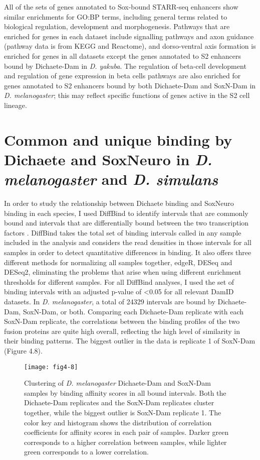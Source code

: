 All of the sets of genes annotated to Sox-bound STARR-seq enhancers show similar enrichments for GO:BP terms, including general terms related to biological regulation, development and morphogenesis. Pathways that are enriched for genes in each dataset include signalling pathways and axon guidance (pathway data is from KEGG and Reactome), and dorso-ventral axis formation is enriched for genes in all datasets except the genes annotated to S2 enhancers bound by Dichaete-Dam in \emph{D. yakuba}. The regulation of beta-cell development and regulation of gene expression in beta cells pathways are also enriched for genes annotated to S2 enhancers bound by both Dichaete-Dam and SoxN-Dam in \emph{D. melanogaster}; this may reflect specific functions of genes active in the S2 cell lineage.

\section{Common and unique binding by Dichaete and SoxNeuro in \emph{D. melanogaster} and \emph{D. simulans}}
In order to study the relationship between Dichaete binding and SoxNeuro binding in each species, I used DiffBind to identify intervals that are commonly bound and intervals that are differentially bound between the two transcription factors \citep{ross-innes_differential_2012-1}. DiffBind takes the total set of binding intervals called in any sample included in the analysis and considers the read densities in those intervals for all samples in order to detect quantitative differences in binding. It also offers three different methods for normalizing all samples together, edgeR, DESeq and DESeq2, eliminating the problems that arise when using different enrichment thresholds for different samples. For all DiffBind analyses, I used the set of binding intervals with an adjusted p-value of \textless 0.05 for all relevant DamID datasets. In \emph{D. melanogaster}, a total of 24329 intervals are bound by Dichaete-Dam, SoxN-Dam, or both. Comparing each Dichaete-Dam replicate with each SoxN-Dam replicate, the correlations between the binding profiles of the two fusion proteins are quite high overall, reflecting the high level of similarity in their binding patterns. The biggest outlier in the data is replicate 1 of SoxN-Dam (Figure 4.8).\\ 

\begin{figure}[H]
\centering
\texttt{[image: fig4-8]}
\caption{Clustering of \emph{D. melanogaster} Dichaete-Dam and SoxN-Dam samples by binding affinity scores in all bound intervals. Both the Dichaete-Dam replicates and the SoxN-Dam replicates cluster together, while the biggest outlier is SoxN-Dam replicate 1. The color key and histogram shows the distribution of correlation coefficients for affinity scores in each pair of samples. Darker green corresponds to a higher correlation between samples, while lighter green corresponds to a lower correlation.}
\label{Figure 4.8}
\end{figure}

